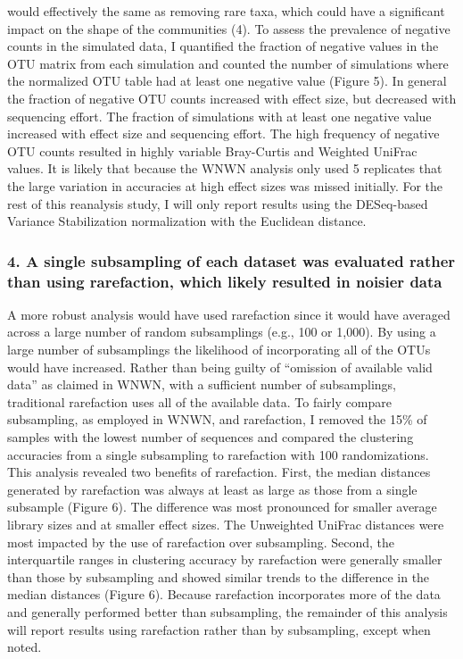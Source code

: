 \documentclass[
]{article}
\begin{document}
would effectively the same as removing rare taxa, which could have a
significant impact on the shape of the communities (4). To assess the
prevalence of negative counts in the simulated data, I quantified the
fraction of negative values in the OTU matrix from each simulation and
counted the number of simulations where the normalized OTU table had at
least one negative value (Figure 5). In general the fraction of negative
OTU counts increased with effect size, but decreased with sequencing
effort. The fraction of simulations with at least one negative value
increased with effect size and sequencing effort. The high frequency of
negative OTU counts resulted in highly variable Bray-Curtis and Weighted
UniFrac values. It is likely that because the WNWN analysis only used 5
replicates that the large variation in accuracies at high effect sizes
was missed initially. For the rest of this reanalysis study, I will only
report results using the DESeq-based Variance Stabilization
normalization with the Euclidean distance.

\hypertarget{a-single-subsampling-of-each-dataset-was-evaluated-rather-than-using-rarefaction-which-likely-resulted-in-noisier-data}{%
\subsubsection{4. A single subsampling of each dataset was evaluated
rather than using rarefaction, which likely resulted in noisier
data}\label{a-single-subsampling-of-each-dataset-was-evaluated-rather-than-using-rarefaction-which-likely-resulted-in-noisier-data}}

A more robust analysis would have used rarefaction since it would have
averaged across a large number of random subsamplings (e.g., 100 or
1,000). By using a large number of subsamplings the likelihood of
incorporating all of the OTUs would have increased. Rather than being
guilty of ``omission of available valid data'' as claimed in WNWN, with
a sufficient number of subsamplings, traditional rarefaction uses all of
the available data. To fairly compare subsampling, as employed in WNWN,
and rarefaction, I removed the 15\% of samples with the lowest number of
sequences and compared the clustering accuracies from a single
subsampling to rarefaction with 100 randomizations. This analysis
revealed two benefits of rarefaction. First, the median distances
generated by rarefaction was always at least as large as those from a
single subsample (Figure 6). The difference was most pronounced for
smaller average library sizes and at smaller effect sizes. The
Unweighted UniFrac distances were most impacted by the use of
rarefaction over subsampling. Second, the interquartile ranges in
clustering accuracy by rarefaction were generally smaller than those by
subsampling and showed similar trends to the difference in the median
distances (Figure 6). Because rarefaction incorporates more of the data
and generally performed better than subsampling, the remainder of this
analysis will report results using rarefaction rather than by
subsampling, except when noted.
\end{document}
